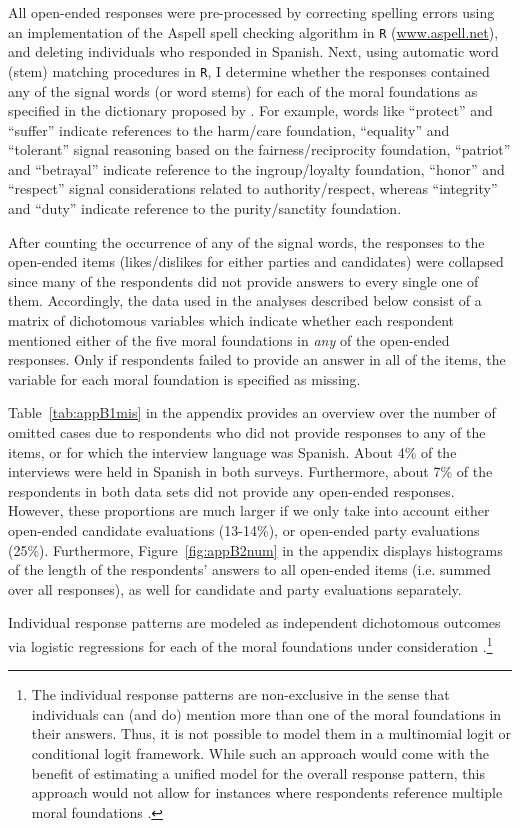 \documentclass[12pt]{article}
\begin{document}
All open-ended responses were pre-processed by correcting spelling errors using an implementation of the Aspell spell checking algorithm in \texttt{R} (\url{www.aspell.net}), and deleting individuals who responded in Spanish. Next, using automatic word (stem) matching procedures in \texttt{R}, I determine whether the responses contained any of the signal words (or word stems) for each of the moral foundations as specified in the dictionary proposed by \citet[][the word lists are also presented in Appendix~\ref{app:oview}]{graham2009liberals}. For example, words like ``protect'' and ``suffer'' indicate references to the harm/care foundation, ``equality'' and ``tolerant'' signal reasoning based on the fairness/reciprocity foundation, ``patriot'' and ``betrayal'' indicate reference to the ingroup/loyalty foundation, ``honor'' and ``respect'' signal considerations related to authority/respect, whereas ``integrity'' and ``duty'' indicate reference to the purity/sanctity foundation.

After counting the occurrence of any of the signal words, the responses to the open-ended items (likes/dislikes for either parties and candidates) were collapsed since many of the respondents did not provide answers to every single one of them. Accordingly, the data used in the analyses described below consist of a matrix of dichotomous variables which indicate whether each respondent mentioned either of the five moral foundations in \textit{any} of the open-ended responses. Only if respondents failed to provide an answer in all of the items, the variable for each moral foundation is specified as missing.

Table~\ref{tab:appB1mis} in the appendix provides an overview over the number of omitted cases due to respondents who did not provide responses to any of the items, or for which the interview language was Spanish. About 4\% of the interviews were held in Spanish in both surveys. Furthermore, about 7\% of the respondents in both data sets did not provide any open-ended responses. However, these proportions are much larger if we only take into account either open-ended candidate evaluations (13-14\%), or open-ended party evaluations (25\%). Furthermore, Figure~\ref{fig:appB2num} in the appendix displays histograms of the length of the respondents' answers to all open-ended items (i.e. summed over all responses), as well for candidate and party evaluations separately.

Individual response patterns are modeled as independent dichotomous outcomes via logistic regressions for each of the moral foundations under consideration \citep[c.f. for example][]{agresti1999modeling}.\footnote{The individual response patterns are non-exclusive in the sense that individuals can (and do) mention more than one of the moral foundations in their answers. Thus, it is not possible to model them in a multinomial logit or conditional logit framework. While such an approach would come with the benefit of estimating a unified model for the overall response pattern, this approach would not allow for instances where respondents reference multiple moral foundations \citep[but see][]{gilbert2007models}.}
\end{document}
